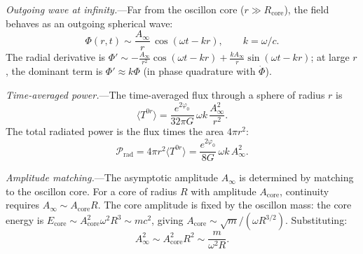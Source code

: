 \documentclass[aps,prd,onecolumn,superscriptaddress,nofootinbib,showpacs,12pt,notitlepage]{revtex4-2}
\begin{document}
\textit{Outgoing wave at infinity.}---Far from the oscillon core
($r \gg R_{\mathrm{core}}$), the field behaves as an outgoing
spherical wave:
\begin{equation}\label{eq:outgoing_wave}
  \Phi(r,t) \sim \frac{A_{\infty}}{r}\,
    \cos(\omega t - kr), \qquad k = \omega/c.
\end{equation}
The radial derivative is $\Phi' \sim -\frac{A_{\infty}}{r^2}\cos(\omega t - kr)
+ \frac{kA_{\infty}}{r}\sin(\omega t - kr)$; at large $r$, the dominant
term is $\Phi' \approx k\Phi$ (in phase quadrature with $\dot{\Phi}$).

\textit{Time-averaged power.}---The time-averaged flux through a
sphere of radius $r$ is
\begin{equation}
  \langle T^{0r} \rangle = \frac{e^{2\varphi_0}}{32\pi G}\,
    \omega k \,\frac{A_{\infty}^2}{r^2}.
\end{equation}
The total radiated power is the flux times the area $4\pi r^2$:
\begin{equation}\label{eq:P_wave}
  \mathcal{P}_{\mathrm{rad}} = 4\pi r^2 \langle T^{0r} \rangle
  = \frac{e^{2\varphi_0}}{8G}\,\omega k \,A_{\infty}^2.
\end{equation}

\textit{Amplitude matching.}---The asymptotic amplitude $A_{\infty}$
is determined by matching to the oscillon core.  For a core of
radius $R$ with amplitude $A_{\mathrm{core}}$, continuity requires
$A_{\infty} \sim A_{\mathrm{core}} R$.  The core amplitude is fixed
by the oscillon mass: the core energy is $E_{\mathrm{core}} \sim
A_{\mathrm{core}}^2 \omega^2 R^3 \sim mc^2$, giving $A_{\mathrm{core}} \sim
\sqrt{m}/(\omega R^{3/2})$.  Substituting:
\begin{equation}
  A_{\infty}^2 \sim A_{\mathrm{core}}^2 R^2
  \sim \frac{m}{\omega^2 R}.
\end{equation}
\end{document}
